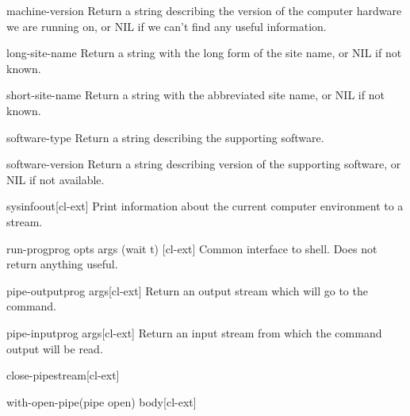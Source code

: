 \documentclass[10pt,english]{book}
\begin{document}
\begin{function}{machine-version}{}
  Return a string describing the version of the computer hardware we
are running on, or NIL if we can't find any useful information.
\end{function}

\begin{function}{long-site-name}{}
  Return a string with the long form of the site name, or NIL if not known.
\end{function}

\begin{function}{short-site-name}{}
  Return a string with the abbreviated site name, or NIL if not known.
\end{function}

\begin{function}{software-type}{}
  Return a string describing the supporting software.
\end{function}

\begin{function}{software-version}{}
  Return a string describing version of the supporting software, or NIL
  if not available.
\end{function}

\begin{function}{sysinfo}{\op out}[cl-ext]
  Print information about the current computer environment to a
  stream.
\end{function}

\begin{function}{run-prog}{prog \rest opts \key args (wait t) \akeys}[cl-ext]
  Common interface to shell. Does not return anything useful.
\end{function}

\begin{function}{pipe-output}{prog \rest args}[cl-ext]
  Return an output stream which will go to the command.
\end{function}

\begin{function}{pipe-input}{prog \rest args}[cl-ext]
  Return an input stream from which the command output will be read.
\end{function}

\begin{function}{close-pipe}{stream}[cl-ext]
  
\end{function}

\begin{function}{with-open-pipe}{(pipe open) \body body}[cl-ext]
  
\end{function}
\end{document}
